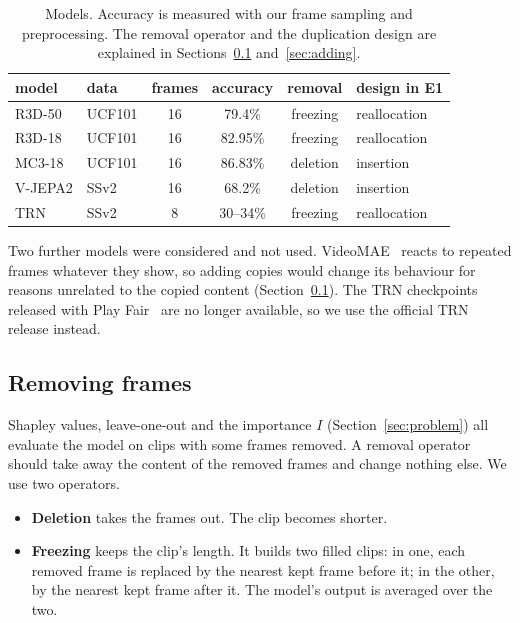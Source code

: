 \begin{table}[h]
\centering
\caption{Models. Accuracy is measured with our frame sampling and preprocessing. The removal operator and the duplication design are explained in Sections~\ref{sec:removal} and~\ref{sec:adding}.}
\label{tab:models}
\begin{tabular}{llcccl}
\toprule
model & data & frames & accuracy & removal & design in E1 \\
\midrule
R3D-50  & UCF101 & 16 & 79.4\%   & freezing & reallocation \\
R3D-18  & UCF101 & 16 & 82.95\%  & freezing & reallocation \\
MC3-18  & UCF101 & 16 & 86.83\%  & deletion & insertion \\
V-JEPA2 & SSv2   & 16 & 68.2\%   & deletion & insertion \\
TRN     & SSv2   & 8  & 30--34\% & freezing & reallocation \\
\bottomrule
\end{tabular}
\end{table}

Two further models were considered and not used.
VideoMAE~ reacts to repeated frames whatever they show, so adding copies would change its behaviour for reasons unrelated to the copied content (Section~\ref{sec:removal}).
The TRN checkpoints released with Play Fair~\citep{will_price_ec92d5a0} are no longer available, so we use the official TRN release instead.

\subsection{Removing frames}
\label{sec:removal}

Shapley values, leave-one-out and the importance $I$ (Section~\ref{sec:problem}) all evaluate the model on clips with some frames removed.
A removal operator should take away the content of the removed frames and change nothing else.
We use two operators.
\begin{itemize}
  \item \textbf{Deletion} takes the frames out. The clip becomes shorter.
  \item \textbf{Freezing} keeps the clip's length. It builds two filled clips: in one, each removed frame is replaced by the nearest kept frame before it; in the other, by the nearest kept frame after it. The model's output is averaged over the two.
\end{itemize}

